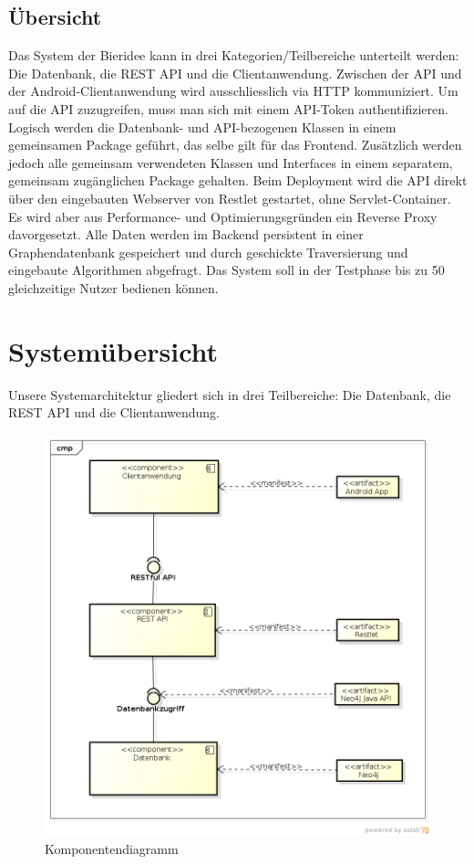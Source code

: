 \documentclass[10pt,a4paper]{scrartcl}
\begin{document}
%
%

\subsection{Übersicht}

Das System der Bieridee kann in drei Kategorien/Teilbereiche unterteilt werden: Die Datenbank, die
REST API und die Clientanwendung. Zwischen der API und der Android-Clientanwendung wird
ausschliesslich via HTTP kommuniziert. Um auf die API zuzugreifen, muss man sich mit einem API-Token
authentifizieren. Logisch werden die Datenbank- und API-bezogenen Klassen in einem gemeinsamen
Package geführt, das selbe gilt für das Frontend. Zusätzlich werden jedoch alle gemeinsam
verwendeten Klassen und Interfaces in einem separatem, gemeinsam zugänglichen Package gehalten.
Beim Deployment wird die API direkt über den eingebauten Webserver von Restlet gestartet, ohne
Servlet-Container. Es wird aber aus Performance- und Optimierungsgründen ein Reverse Proxy
davorgesetzt. Alle Daten werden im Backend persistent in einer Graphendatenbank gespeichert und
durch geschickte Traversierung und eingebaute Algorithmen abgefragt. Das System soll in der
Testphase bis zu 50 gleichzeitige Nutzer bedienen können.


\newpage
\section{Systemübersicht}
Unsere Systemarchitektur gliedert sich in drei Teilbereiche: Die Datenbank, die REST API
und die Clientanwendung.

\begin{figure}[H]
	\includegraphics[width=\textwidth]{ComponentDiagram.png}
	\caption{Komponentendiagramm}
	\label{fig:component_diagram}
\end{figure}
\end{document}
